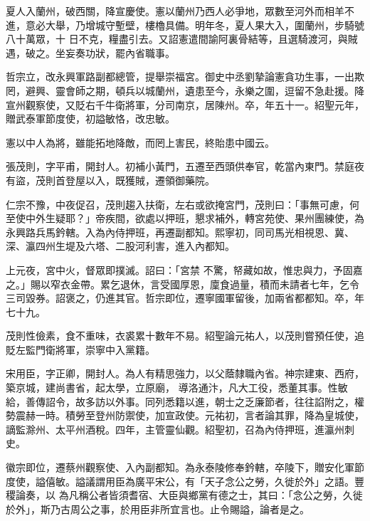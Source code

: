 \begin{pinyinscope}
 夏人入蘭州，破西關，降宣慶使。憲以蘭州乃西人必爭地，眾數至河外而相羊不進，意必大舉，乃增城守塹壁，樓櫓具備。明年冬，夏人果大入，圍蘭州，步騎號八十萬眾，十
 日不克，糧盡引去。又詔憲遣間諭阿裏骨結等，且選騎渡河，與賊遇，破之。坐妄奏功狀，罷內省職事。



 哲宗立，改永興軍路副都總管，提舉崇福宮。御史中丞劉摯論憲貪功生事，一出欺罔，避興、靈會師之期，頓兵以城蘭州，遺患至今，永樂之圍，逗留不急赴援。降宣州觀察使，又貶右千牛衛將軍，分司南京，居陳州。卒，年五十一。紹聖元年，贈武泰軍節度使，初謚敏恪，改忠敏。



 憲以中人為將，雖能拓地降敵，而罔上害民，終貽患中國云。



 張茂則，字平甫，開封人。初補小黃門，五遷至西頭供奉官，乾當內東門。禁庭夜有盜，茂則首登屋以入，既獲賊，遷領御藥院。



 仁宗不豫，中夜促召，茂則趨入扶衛，左右或欲掩宮門，茂則曰：「事無可慮，何至使中外生疑耶？」帝疾間，欲處以押班，懇求補外，轉宮苑使、果州團練使，為永興路兵馬鈐轄。入為內侍押班，再遷副都知。熙寧初，同司馬光相視恩、冀、深、瀛四州生堤及六塔、二股河利害，進入內都知。



 上元夜，宮中火，督眾即撲滅。詔曰：「宮禁
 不驚，帑藏如故，惟忠與力，予固嘉之。」賜以窄衣金帶。累乞退休，言受國厚恩，廩食過量，積而未請者七年，乞令三司毀券。詔褒之，仍進其官。哲宗即位，遷寧國軍留後，加兩省都都知。卒，年七十九。



 茂則性儉素，食不重味，衣裘累十數年不易。紹聖論元祐人，以茂則嘗預任使，追貶左監門衛將軍，崇寧中入黨籍。



 宋用臣，字正卿，開封人。為人有精思強力，以父蔭隸職內省。神宗建東、西府，築京城，建尚書省，起太學，立原廟，
 導洛通汴，凡大工役，悉董其事。性敏給，善傳詔令，故多訪以外事。同列悉籍以進，朝士之乏廉節者，往往諂附之，權勢震赫一時。積勞至登州防禦使，加宣政使。元祐初，言者論其罪，降為皇城使，謫監滁州、太平州酒稅。四年，主管靈仙觀。紹聖初，召為內侍押班，進瀛州刺史。



 徽宗即位，遷蔡州觀察使、入內副都知。為永泰陵修奉鈐轄，卒陵下，贈安化軍節度使，謚僖敏。謚議謂用臣為廣平宋公，有「天子念公之勞，久徙於外」之語。豐稷論奏，以
 為凡稱公者皆須耆宿、大臣與鄉黨有德之士，其曰：「念公之勞，久徙於外」，斯乃古周公之事，於用臣非所宜言也。止令賜謚，論者是之。




\end{pinyinscope}
